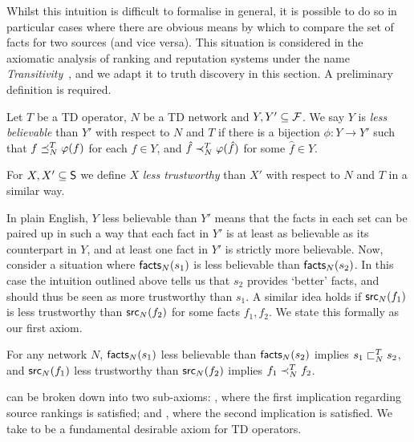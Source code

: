 Whilst this intuition is difficult to formalise in general, it is possible to
do so in particular cases where there are obvious means by which to compare the
set of facts for two sources (and vice versa). This situation is considered in
the axiomatic analysis of ranking and reputation systems under the name
\emph{Transitivity}~\cite{tennenholtz2004,altman2008}, and we adapt it to truth
discovery in this section. A preliminary definition is required.

\begin{definition}
\label{td_def_coherence_less_believable}

Let $T$ be a TD operator, $N$ be a TD network and $Y, Y' \subseteq \F$. We
say $Y$ is \emph{less believable} than $Y'$ with respect to $N$ and $T$
if there is a bijection $\phi: Y \to Y'$ such that $f \fle_N^T \phi(f)$ for
each $f \in Y$, and $\hat{f} \flt_N^T \phi(\hat{f})$ for some $\hat{f} \in Y$.

For $X, X' \subseteq \S$ we define $X$ \emph{less trustworthy} than $X'$ with
respect to $N$ and $T$ in a similar way.

\end{definition}

In plain English, $Y$ less believable than $Y'$ means that the facts in each
set can be paired up in such a way that each fact in $Y'$ is at least as
believable as its counterpart in $Y$, and at least one fact in $Y'$ is strictly
more believable. Now, consider a situation where $\facts_N(s_1)$ is less
believable than $\facts_N(s_2)$. In this case the intuition outlined above
tells us that $s_2$ provides `better' facts, and should thus be seen as more
trustworthy than $s_1$. A similar idea holds if $\src_N(f_1)$ is less
trustworthy than $\src_N(f_2)$ for some facts $f_1, f_2$. We state this
formally as our first axiom.

\begin{axiom}[\coherence{}]

For any network $N$, $\facts_N(s_1)$ less believable than $\facts_N(s_2)$
implies $s_1 \slt_N^T s_2$, and $\src_N(f_1)$ less trustworthy than
$\src_N(f_2)$ implies $f_1 \flt_N^T f_2$.

\end{axiom}

\coherence{} can be broken down into two sub-axioms: \sourcecoherence{},
where the first implication regarding source rankings is satisfied; and
\factcoherence{}, where the second implication is satisfied. We take
\coherence{} to be a fundamental desirable axiom for TD operators.

